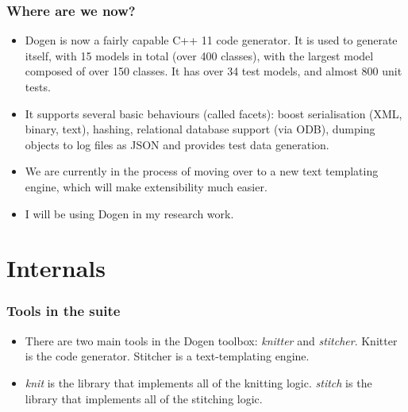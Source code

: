 \documentclass{beamer}
\begin{document}
\begin{frame}
\frametitle{Where are we now?}

\begin{itemize}

\item Dogen is now a fairly capable C++ 11 code generator. It is used
  to generate itself, with 15 models in total (over 400 classes), with
  the largest model composed of over 150 classes. It has over 34 test
  models, and almost 800 unit tests.

\pause

\item It supports several basic behaviours (called facets): boost
  serialisation (XML, binary, text), hashing, relational database
  support (via ODB), dumping objects to log files as JSON and provides
  test data generation.

\pause

\item We are currently in the process of moving over to a new text
  templating engine, which will make extensibility much easier.

\pause

\item I will be using Dogen in my research work.

\end{itemize}

\end{frame}

\section{Internals}

\begin{frame}
\frametitle{Tools in the suite}

\begin{itemize}

\item There are two main tools in the Dogen toolbox: \emph{knitter}
  and \emph{stitcher}. Knitter is the code generator. Stitcher is a
  text-templating engine.

\pause

\item \emph{knit} is the library that implements all of the knitting
  logic. \emph{stitch} is the library that implements all of the
  stitching logic.

\end{itemize}

\end{frame}
\end{document}
